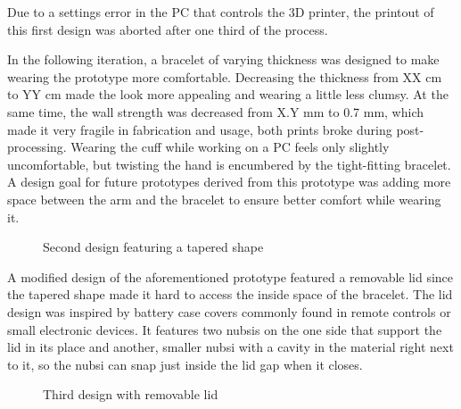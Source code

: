 Due to a settings error in the PC that controls the 3D printer, the printout of this first design was aborted after one third of the process.

In the following iteration, a bracelet of varying thickness was designed to make wearing the prototype more comfortable. Decreasing the thickness from XX cm to YY cm made the look more appealing and wearing a little less clumsy. At the same time, the wall strength was decreased from X.Y mm to 0.7 mm, which made it very fragile in fabrication and usage, both prints broke during post-processing. Wearing the cuff while working on a PC feels only slightly uncomfortable, but twisting the hand is encumbered by the tight-fitting bracelet. A design goal for future prototypes derived from this prototype was adding more space between the arm and the bracelet to ensure better comfort while wearing it.

\begin{figure}[bth]
	\myfloatalign
	 \quad
	\caption{Second design featuring a tapered shape}
\end{figure}

A modified design of the aforementioned prototype featured a removable lid since the tapered shape made it hard to access the inside space of the bracelet. The lid design was inspired by battery case covers commonly found in remote controls or small electronic devices. It features two nubsis on the one side that support the lid in its place and another, smaller nubsi with a cavity in the material right next to it, so the nubsi can snap just inside the lid gap when it closes.

\begin{figure}[bth]
	\myfloatalign
	 \quad
	\caption{Third design with removable lid}
\end{figure}

